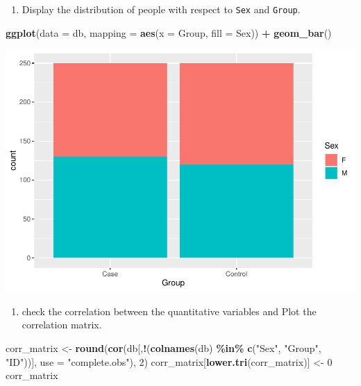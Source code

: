 \documentclass[
]{article}
\newenvironment{Shaded}{\begin{snugshade}}{\end{snugshade}}
\newcommand{\AttributeTok}[1]{\textcolor[rgb]{0.13,0.29,0.53}{#1}}
\newcommand{\DecValTok}[1]{\textcolor[rgb]{0.00,0.00,0.81}{#1}}
\newcommand{\FunctionTok}[1]{\textcolor[rgb]{0.13,0.29,0.53}{\textbf{#1}}}
\newcommand{\NormalTok}[1]{#1}
\newcommand{\OtherTok}[1]{\textcolor[rgb]{0.56,0.35,0.01}{#1}}
\newcommand{\SpecialCharTok}[1]{\textcolor[rgb]{0.81,0.36,0.00}{\textbf{#1}}}
\newcommand{\StringTok}[1]{\textcolor[rgb]{0.31,0.60,0.02}{#1}}
\providecommand{\tightlist}{%
  \setlength{\itemsep}{0pt}\setlength{\parskip}{0pt}}
\begin{document}
\begin{enumerate}
\def\labelenumi{\alph{enumi}.}
\setcounter{enumi}{12}
\tightlist
\item
  Display the distribution of people with respect to \texttt{Sex} and
  \texttt{Group}.
\end{enumerate}

\begin{Shaded}
\begin{Highlighting}[]
\FunctionTok{ggplot}\NormalTok{(}\AttributeTok{data =}\NormalTok{ db, }
       \AttributeTok{mapping =} \FunctionTok{aes}\NormalTok{(}\AttributeTok{x =}\NormalTok{ Group, }\AttributeTok{fill =}\NormalTok{ Sex)) }\SpecialCharTok{+} 
  \FunctionTok{geom\_bar}\NormalTok{()}
\end{Highlighting}
\end{Shaded}

\includegraphics{Simulated_example_files/figure-latex/unnamed-chunk-14-1.pdf}

\begin{enumerate}
\def\labelenumi{\alph{enumi}.}
\setcounter{enumi}{13}
\tightlist
\item
  check the correlation between the quantitative variables and Plot the
  correlation matrix.
\end{enumerate}

\begin{Shaded}
\begin{Highlighting}[]
\NormalTok{corr\_matrix }\OtherTok{\textless{}{-}} \FunctionTok{round}\NormalTok{(}\FunctionTok{cor}\NormalTok{(db[,}\SpecialCharTok{!}\NormalTok{(}\FunctionTok{colnames}\NormalTok{(db) }\SpecialCharTok{\%in\%} \FunctionTok{c}\NormalTok{(}\StringTok{"Sex"}\NormalTok{, }\StringTok{"Group"}\NormalTok{, }\StringTok{"ID"}\NormalTok{))], }\AttributeTok{use =} \StringTok{"complete.obs"}\NormalTok{), }\DecValTok{2}\NormalTok{)}
\NormalTok{corr\_matrix[}\FunctionTok{lower.tri}\NormalTok{(corr\_matrix)] }\OtherTok{\textless{}{-}} \DecValTok{0}
\NormalTok{corr\_matrix}
\end{Highlighting}
\end{Shaded}
\end{document}
